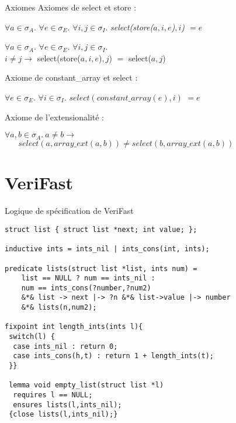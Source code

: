 \documentclass[]{beamer}
\newcommand{\verifast}{VeriFast}
\begin{document}
\begin{frame}{Axiomes}
Axiomes de select et store :

	$\forall a\in \sigma_A.$ $\forall e\in \sigma_E.$ $\forall i,j\in \sigma_I.$
	\textit{select(store($a,i,e$)$,i$) $ = e$}
	
	$\forall a\in \sigma_A.$ $\forall e\in \sigma_E.$ $\forall i,j\in \sigma_I.$ 
	\\ \hspace{20pt}
	$i\neq j \rightarrow$ select(store($a,i,e$)$,j$) $=$ select($a,j$)
			  		
Axiome de constant_array et select :
  
    $\forall e\in\sigma_E.$ $\forall i\in \sigma_I.$ $select(constant\_array(e),i)$ $= e$
    
Axiome de l'extensionalit\'e :

	$\forall a,b\in\sigma_A. \ a \neq b\rightarrow$ \\ $\hspace{20pt}select(a,array\_ext(a,b)) \neq select(b,array\_ext(a,b))$
	
	

	
\end{frame}





\section{\verifast}




\begin{frame}
\tableofcontents[currentsection]
\end{frame}





\begin{frame}[fragile]{Logique de sp\'ecification de \verifast}

\begin{lstlisting}[basicstyle=\footnotesize]
struct list { struct list *next; int value; };
				
inductive ints = ints_nil | ints_cons(int, ints);

predicate lists(struct list *list, ints num) =
	list == NULL ? num == ints_nil :
	num == ints_cons(?number,?num2) 
	&*& list -> next |-> ?n &*& list->value |-> number
	&*& lists(n,num2);
	
fixpoint int length_ints(ints l){
 switch(l) {
  case ints_nil : return 0;
  case ints_cons(h,t) : return 1 + length_ints(t);
 }}
 
 lemma void empty_list(struct list *l)
  requires l == NULL;
  ensures lists(l,ints_nil);
 {close lists(l,ints_nil);}
	\end{lstlisting}

\end{frame}
\end{document}
